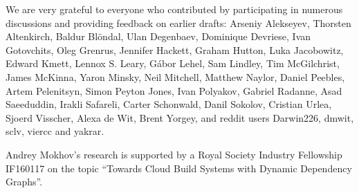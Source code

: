 \documentclass[acmsmall,review]{acmart}\settopmatter{printfolios=true}
\newcommand{\cmd}[1]{\textsf{\color[rgb]{0,0,0.5} #1}}
\begin{document}


\maketitle
\thispagestyle{firstpagestyle}










\begin{acks}
  \vspace{-0.5mm}
  We are very grateful to everyone who contributed by participating in numerous
  discussions and providing feedback on earlier drafts: Arseniy Alekseyev,
  Thorsten Altenkirch, Baldur Bl{\"o}ndal, Ulan Degenbaev, Dominique Devriese,
  Ivan Gotovchits, Oleg Grenrus, Jennifer Hackett, Graham Hutton,
  Luka Jacobowitz, Edward Kmett, Lennox S. Leary, G\'abor Lehel, Sam Lindley,
  Tim McGilchrist, James McKinna, Yaron Minsky, Neil Mitchell, Matthew Naylor,
  Daniel Peebles, Artem Pelenitsyn, Simon Peyton Jones, Ivan Polyakov,
  Gabriel Radanne, Asad Saeeduddin, Irakli Safareli, Carter Schonwald,
  Danil Sokolov, Cristian Urlea, Sjoerd Visscher, Alexa de Wit, Brent Yorgey,
  and reddit users \cmd{Darwin226}, \cmd{dmwit}, \cmd{sclv}, \cmd{viercc} and
  \cmd{yakrar}.

  Andrey Mokhov's research is supported by a Royal Society Industry Fellowship
  \cmd{IF160117} on the topic ``Towards Cloud Build Systems with Dynamic
  Dependency Graphs''.
  \vspace{-1.5mm}
\end{acks}



\end{document}
